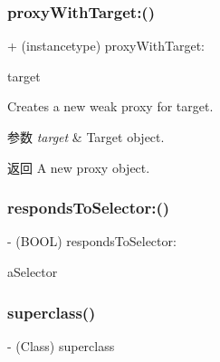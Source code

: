 \subsubsection{\texorpdfstring{proxy\+With\+Target\+:()}{proxyWithTarget:()}}
{\footnotesize\ttfamily + (instancetype) proxy\+With\+Target\+: \begin{DoxyParamCaption}\item[{(id)}]{target }\end{DoxyParamCaption}}

Creates a new weak proxy for target.


\begin{DoxyParams}{参数}
{\em target} & Target object.\\
\hline
\end{DoxyParams}
\begin{DoxyReturn}{返回}
A new proxy object. 
\end{DoxyReturn}
\mbox{\label{interface_m_a_r_weak_proxy_a68992024ce8112aaa4ac633a36580c3f}} 
\subsubsection{\texorpdfstring{responds\+To\+Selector\+:()}{respondsToSelector:()}}
{\footnotesize\ttfamily -\/ (B\+O\+OL) responds\+To\+Selector\+: \begin{DoxyParamCaption}\item[{(S\+EL)}]{a\+Selector }\end{DoxyParamCaption}\hspace{0.3cm}{\ttfamily [implementation]}}

\mbox{\label{interface_m_a_r_weak_proxy_a01b83d4be99392aaf2b5927d77b95d2a}} 
\subsubsection{\texorpdfstring{superclass()}{superclass()}}
{\footnotesize\ttfamily -\/ (Class) superclass \begin{DoxyParamCaption}{ }\end{DoxyParamCaption}\hspace{0.3cm}{\ttfamily [implementation]}}



